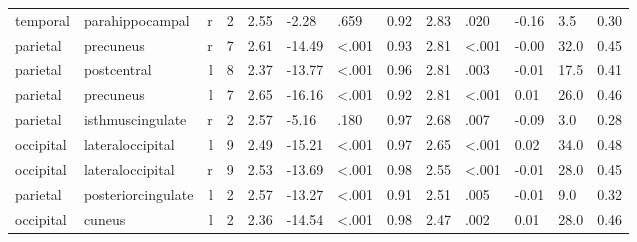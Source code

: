 \documentclass{article}
\begin{document}
\begin{longtable}{llrR{1.5cm}R{1cm}R{1.3cm}R{1cm}R{1cm}R{1.3cm}R{1cm}R{1.8cm}R{1.3cm}R{1.8cm}}
  temporal &           parahippocampal &    r &            2 &                  2.55 &            -2.28 &               .659 &                               0.92 &                          2.83 &                            .020 & -0.16 &    3.5 &      0.30 \\
  parietal &                 precuneus &    r &            7 &                  2.61 &           -14.49 &      \textless.001 &                               0.93 &                          2.81 &                   \textless.001 & -0.00 &   32.0 &      0.45 \\
  parietal &               postcentral &    l &            8 &                  2.37 &           -13.77 &      \textless.001 &                               0.96 &                          2.81 &                            .003 & -0.01 &   17.5 &      0.41 \\
  parietal &                 precuneus &    l &            7 &                  2.65 &           -16.16 &      \textless.001 &                               0.92 &                          2.81 &                   \textless.001 &  0.01 &   26.0 &      0.46 \\
  parietal &          isthmuscingulate &    r &            2 &                  2.57 &            -5.16 &               .180 &                               0.97 &                          2.68 &                            .007 & -0.09 &    3.0 &      0.28 \\
 occipital &          lateraloccipital &    l &            9 &                  2.49 &           -15.21 &      \textless.001 &                               0.97 &                          2.65 &                   \textless.001 &  0.02 &   34.0 &      0.48 \\
 occipital &          lateraloccipital &    r &            9 &                  2.53 &           -13.69 &      \textless.001 &                               0.98 &                          2.55 &                   \textless.001 & -0.01 &   28.0 &      0.45 \\
  parietal &        posteriorcingulate &    l &            2 &                  2.57 &           -13.27 &      \textless.001 &                               0.91 &                          2.51 &                            .005 & -0.01 &    9.0 &      0.32 \\
 occipital &                    cuneus &    l &            2 &                  2.36 &           -14.54 &      \textless.001 &                               0.98 &                          2.47 &                            .002 &  0.01 &   28.0 &      0.46 \\

\end{longtable}
\end{document}
